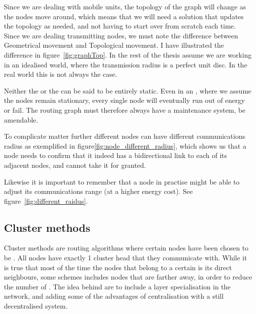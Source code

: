 \documentclass[letter, 12pt, english, draft]{article}
\begin{document}
Since we are dealing with mobile units, the topology of the graph will change as the nodes move around, which means that we will need a solution that updates the topology as needed, and not having to start over from scratch each time. Since we are dealing transmitting nodes, we must note the difference between Geometrical movement and Topological movement. I have illustrated the difference in figure~\ref{fig:graphTop}. In the rest of the thesis assume we are working in an idealised world, where the transmission radius is a perfect unit disc. In the real world this is not always the case.

Neither the \manet or the \anet can be said to be entirely static. Even in an \anet, where we assume the nodes remain stationary, every single node will eventually run out of energy or fail. The routing graph must therefore always have a maintenance system, be amendable. 


To complicate matter further different nodes can have different communications radius as exemplified in figure\ref{fig:node_different_radius}, which shows us that a node needs to confirm that it indeed has a bidirectional link to each of its adjacent nodes, and cannot take it for granted.


Likewise it is important to remember that a node in practise might be able to adjust its communications range (at a higher energy cost). See figure~\ref{fig:different_raidus}.

\subsection{Cluster methods}
\label{cluster methods}
Cluster methods are routing algorithms where certain nodes have been chosen to be \ch. All nodes have exactly 1 cluster head that they communicate with. While it is true that most of the time the nodes that belong to a certain \ch is its direct neighbours, some schemes includes nodes that are farther away, in order to reduce the number of \ch. The idea behind \ch are to include a layer specialisation in the network, and adding some of the advantages of centralisation with a still decentralised system. 
\end{document}
